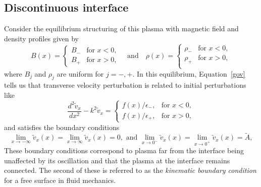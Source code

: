\documentclass[12pt]{../style-files/ociamthesis}
\begin{document}
\subsection{Discontinuous interface}

Consider the equilibrium structuring of this plasma with magnetic field and density profiles given by
\begin{equation}
B(x)=
\begin{cases}
B_- & \text{for  }x<0, \\
B_+ & \text{for  }x>0,
\end{cases}
\quad \text{and} \quad
\rho(x)=
\begin{cases}
\rho_- & \text{for  }x<0, \\
\rho_+ & \text{for  }x>0, \\
\end{cases}
\end{equation}
where $B_j$ and $\rho_j$ are uniform for $j = -, +$. In this equilibrium, Equation~\eqref{gov} tells us that transverse velocity perturbation is related to initial perturbations like
\begin{equation}
\frac{d^2\tilde{v}_x}{dx^2} - k^2\tilde{v}_x = 
\begin{cases}
f(x)/\epsilon_-, & \text{for  } x < 0,\\
f(x)/\epsilon_+, & \text{for  } x > 0,
\end{cases}
\label{ivp interface gov}
\end{equation}
and satisfies the boundary conditions
\begin{equation}
\lim_{x \to -\infty}\tilde{v}_x(x) = \lim_{x \to \infty}\tilde{v}_x(x) = 0, \text{ and } \lim_{x \to 0^-}\tilde{v}_x(x) = \lim_{x \to 0^+}\tilde{v}_x(x) = \tilde{A},
\label{ivp interface BC}
\end{equation}
These boundary conditions correspond to plasma far from the interface being unaffected by its oscillation and that the plasma at the interface remains connected. The second of these is referred to as the \textit{kinematic boundary condition} for a free surface in fluid mechanics.
\end{document}
